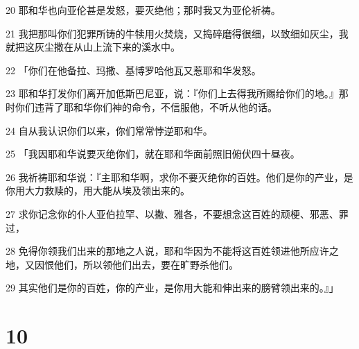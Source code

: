 \par 20 耶和华也向亚伦甚是发怒，要灭绝他；那时我又为亚伦祈祷。
\par 21 我把那叫你们犯罪所铸的牛犊用火焚烧，又捣碎磨得很细，以致细如灰尘，我就把这灰尘撒在从山上流下来的溪水中。
\par 22 「你们在他备拉、玛撒、基博罗哈他瓦又惹耶和华发怒。
\par 23 耶和华打发你们离开加低斯巴尼亚，说：『你们上去得我所赐给你们的地。』那时你们违背了耶和华你们神的命令，不信服他，不听从他的话。
\par 24 自从我认识你们以来，你们常常悖逆耶和华。
\par 25 「我因耶和华说要灭绝你们，就在耶和华面前照旧俯伏四十昼夜。
\par 26 我祈祷耶和华说：『主耶和华啊，求你不要灭绝你的百姓。他们是你的产业，是你用大力救赎的，用大能从埃及领出来的。
\par 27 求你记念你的仆人亚伯拉罕、以撒、雅各，不要想念这百姓的顽梗、邪恶、罪过，
\par 28 免得你领我们出来的那地之人说，耶和华因为不能将这百姓领进他所应许之地，又因恨他们，所以领他们出去，要在旷野杀他们。
\par 29 其实他们是你的百姓，你的产业，是你用大能和伸出来的膀臂领出来的。』」

\chapter{10}

